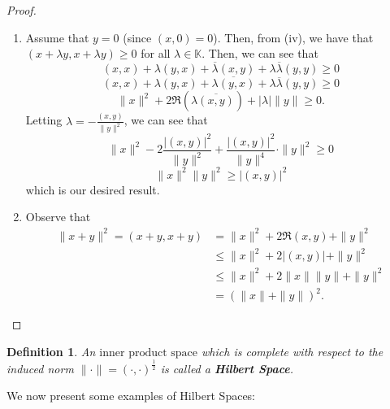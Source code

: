 \documentclass[12pt]{article}
\newtheorem{definition}{Definition}
\def\K{\mathbb{K}}
\newcommand{\ov}{\overline}
\newcommand{\inner}{(\cdot, \cdot)}
\newcommand{\ips}{\text{inner product space}}
\begin{document}
\begin{proof}
\begin{enumerate}
\item Assume that $y = 0$ (since $(x, 0) = 0$). Then, from (iv), we have that $(x + \lambda y, x + \lambda y) \geq 0$ for all $\lambda \in \K$. Then, we can see that 
\[ (x, x) + \lambda(y, x) + \ov{\lambda} (x, y) + \lambda \ov{\lambda} (y, y) \geq 0\]
\[(x, x) + \lambda(y, x) + \ov{\lambda  (y, x)} + \lambda \ov{\lambda} (y, y) \geq 0 \]
\[\| x \|^2 + 2 \Re\left( \lambda \ov{(x, y)} \right) + |\lambda| \| y \| \geq 0. \]
Letting $\lambda = - \frac{(x, y)}{\| y\|^2}$, we can see that 
\[ \| x \|^2 - 2 \frac{|(x, y)|^2}{\| y \|^2} + \frac{|(x, y)|^2}{\| y \|^4} \cdot \| y \|^2 \geq 0\]
\[ \| x \|^2 \| y\|^2 \geq |(x, y)|^2\]
which is our desired result.
\item Observe that 
\begin{align*}
\| x+ y \|^2 = (x + y, x+ y) & = \| x\|^2 + 2 \Re (x, y) + \| y\|^2 \\
& \leq \| x \|^2 + 2 |(x, y)| + \| y \|^2 \\
& \leq \| x\|^2 + 2 \| x \| \| y\| + \| y\|^2 \\
& = (\| x \| + \| y \| )^2.
\end{align*}
\end{enumerate}
\end{proof}
\vspace{-20pt}
\begin{definition}
An $\ips$ which is complete with respect to the induced norm $\| \cdot \| = \inner^{\frac{1}{2}}$ is called a \textbf{Hilbert Space}.
\end{definition}
\vspace{-25pt}
We now present some examples of Hilbert Spaces: 
\end{document}
